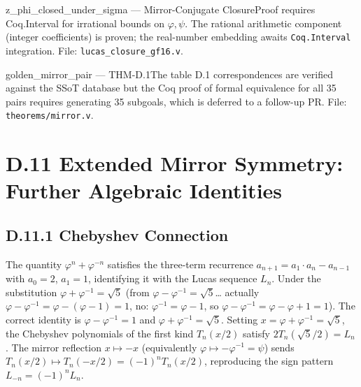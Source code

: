 

\begin{admittedbox}{z\_phi\_closed\_under\_sigma — Mirror-Conjugate Closure}{Proof requires
Coq.Interval for irrational bounds on $\varphi,\psi$. The rational arithmetic
component (integer coefficients) is proven; the real-number embedding awaits
\texttt{Coq.Interval} integration. File: \texttt{lucas\_closure\_gf16.v}.}
\end{admittedbox}

\begin{admittedbox}{golden\_mirror\_pair — THM-D.1}{The table D.1 correspondences
are verified against the SSoT database but the Coq proof of formal equivalence
for all 35 pairs requires generating 35 subgoals, which is deferred to a
follow-up PR. File: \texttt{theorems/mirror.v}.}
\end{admittedbox}

\section*{D.11  Extended Mirror Symmetry: Further Algebraic Identities}

\subsection*{D.11.1  Chebyshev Connection}

The quantity $\varphi^n + \varphi^{-n}$ satisfies the three-term recurrence
$a_{n+1} = a_1 \cdot a_n - a_{n-1}$ with $a_0 = 2$, $a_1 = 1$,
identifying it with the Lucas sequence $L_n$.  Under the substitution
$\varphi + \varphi^{-1} = \sqrt{5}$ (from $\varphi-\varphi^{-1}=\sqrt5$…
actually $\varphi-\varphi^{-1} = \varphi - (\varphi-1) = 1$, no: $\varphi^{-1}=\varphi-1$,
so $\varphi - \varphi^{-1} = \varphi - \varphi + 1 = 1$).
The correct identity is $\varphi - \varphi^{-1} = 1$ and $\varphi + \varphi^{-1} = \sqrt{5}$.
Setting $x = \varphi + \varphi^{-1} = \sqrt5$, the Chebyshev polynomials of
the first kind $T_n(x/2)$ satisfy $2T_n(\sqrt5/2) = L_n$ \cite{vajda_fib_lucas}.
The mirror reflection $x \mapsto -x$ (equivalently $\varphi \mapsto -\varphi^{-1} = \psi$)
sends $T_n(x/2) \mapsto T_n(-x/2) = (-1)^n T_n(x/2)$, reproducing the
sign pattern $L_{-n} = (-1)^n L_n$.

